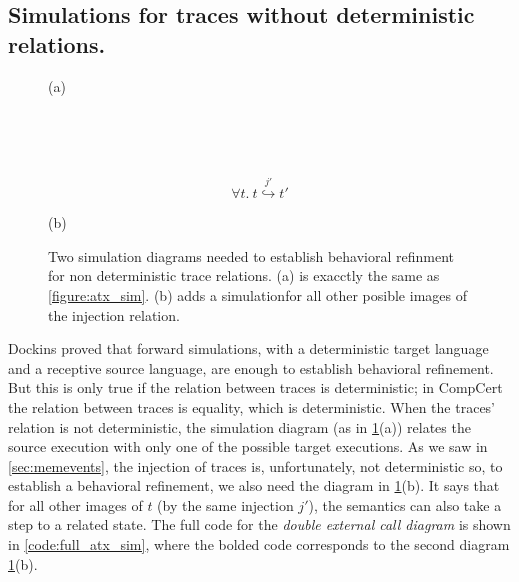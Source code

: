 \subsection{Simulations for traces without deterministic relations. }\label{sssec:fixsim}
 \begin{figure}\centering
 \begin{multicols}{2}


(a)

\columnbreak

\

\

$$\forall t.\ t \overset{j'}{\hookrightarrow} t'$$

(b)
\end{multicols}
\caption[Double diagram simulation]{Two simulation diagrams needed to establish behavioral refinment for non deterministic trace relations. (a) is exacctly the same as \cref{figure:atx_sim}. (b) adds a simulationfor all other posible images of the injection relation.}\label{figure:atx_sim_strong}
\end{figure}
Dockins \cite{dockinsthesis} proved that forward simulations, with a deterministic target language and a receptive source language, are enough to establish behavioral refinement. But this is only true if the relation between traces is deterministic; in CompCert the relation between traces is equality, which is deterministic. When the traces' relation is not deterministic, the simulation diagram (as in \cref{figure:atx_sim_strong}(a)) relates the source execution with only one of the possible target executions. As we saw in \cref{sec:memevents}, the injection of traces is, unfortunately, not deterministic so, to establish a behavioral refinement, we also need the diagram in \cref{figure:atx_sim_strong}(b). It says that for all other images of $t$ (by the same injection $j'$), the semantics can also take a step to a related state. The full code for the \emph{double external call diagram} is shown in \cref{code:full_atx_sim}, where the bolded code corresponds to the second diagram  \cref{figure:atx_sim_strong}(b).


